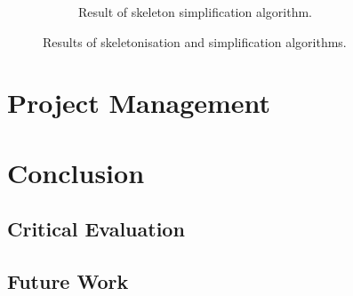 \documentclass[a4paper, 12pt]{article}
\begin{document}
\begin{figure}[H]
\begin{subfigure}{\textwidth}
  		\caption{Result of skeleton simplification algorithm.}
  		\label{fig:skel_reduced}
	\end{subfigure}
\caption{Results of skeletonisation and simplification algorithms.}
\end{figure}
%

\section{Project Management}

\section{Conclusion}
	\subsection{Critical Evaluation}
	\subsection{Future Work}
\end{document}
